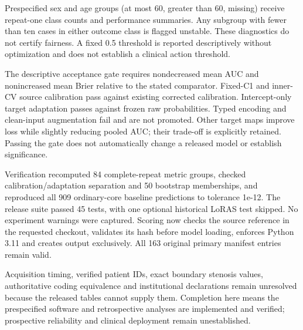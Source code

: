 \documentclass[conference]{IEEEtran}
\begin{document}
Prespecified sex and age groups (at most 60, greater than 60, missing) receive repeat-one class counts and performance summaries. Any subgroup with fewer than ten cases in either outcome class is flagged unstable. These diagnostics do not certify fairness. A fixed 0.5 threshold is reported descriptively without optimization and does not establish a clinical action threshold.

The descriptive acceptance gate requires nondecreased mean AUC and nonincreased mean Brier relative to the stated comparator. Fixed-C1 and inner-CV source calibration pass against existing corrected calibration. Intercept-only target adaptation passes against frozen raw probabilities. Typed encoding and clean-input augmentation fail and are not promoted. Other target maps improve loss while slightly reducing pooled AUC; their trade-off is explicitly retained. Passing the gate does not automatically change a released model or establish significance.

Verification recomputed 84 complete-repeat metric groups, checked calibration/adaptation separation and 50 bootstrap memberships, and reproduced all 909 ordinary-core baseline predictions to tolerance 1e-12. The release suite passed 45 tests, with one optional historical LoRAS test skipped. No experiment warnings were captured. Scoring now checks the source reference in the requested checkout, validates its hash before model loading, enforces Python 3.11 and creates output exclusively. All 163 original primary manifest entries remain valid.

Acquisition timing, verified patient IDs, exact boundary stenosis values, authoritative coding equivalence and institutional declarations remain unresolved because the released tables cannot supply them. Completion here means the prespecified software and retrospective analyses are implemented and verified; prospective reliability and clinical deployment remain unestablished.
\end{document}
